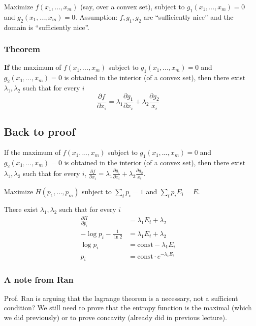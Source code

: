 \documentclass{article}
\begin{document}
Maximize $f(x_1,\ldots,x_m)$ (say, over a convex set), subject to $g_1(x_1,\ldots,x_m)=0$ and $g_2\left(x_1,\ldots,x_m\right)=0$. Assumption: $f,g_1,g_2$ are ``sufficiently nice'' and the domain is ``sufficiently nice''.

\subsubsection{Theorem}

\textbf{If} the maximum of $f(x_1,\ldots,x_m)$ subject to $g_1(x_1,\ldots,x_m)=0$ and $g_2\left(x_1,\ldots,x_m\right)=0$ is obtained in the interior (of a convex set), then there exist $\lambda_1,\lambda_2$ such that for every $i$
\[
\frac{\partial f }{\partial x_i} = \lambda_1 \frac{\partial g_1}{\partial x_i} + \lambda_2 \frac{\partial g_2}{x_i}
\]

\subsection{Back to proof}
If the maximum of $f(x_1,\ldots,x_m)$ subject to $g_1(x_1,\ldots,x_m)=0$ and $g_2\left(x_1,\ldots,x_m\right)=0$ is obtained in the interior (of a convex set), then there exist $\lambda_1,\lambda_2$ such that for every $i$, $\frac{\partial f }{\partial x_i} = \lambda_1 \frac{\partial g_1}{\partial x_i} + \lambda_2 \frac{\partial g_2}{x_i}$. 

Maximize $H\left(p_1,\ldots, p_m\right)$ subject to $\sum_i p_i=1$ and $\sum_i p_i E_i=E$.

There exist $\lambda_1,\lambda_2$ such that for every $i$
\begin{align*}
    \frac{\partial H}{\partial p_i} &= \lambda_1 E_i + \lambda_2\\
    -\log p_i - \frac{1}{\ln 2} &= \lambda_1 E_i + \lambda_2\\
    \log p_i &= \text{const} - \lambda_1 E_i\\
    p_i &= \text{const}\cdot e^{-\lambda_1 E_i}
\end{align*}

\subsubsection{A note from Ran}

Prof. Ran is arguing that the lagrange theorem is a necessary, not a sufficient condition? We still need to prove that the entropy function is the maximal (which we did previously) or to prove concavity (already did in previous lecture).
\end{document}
